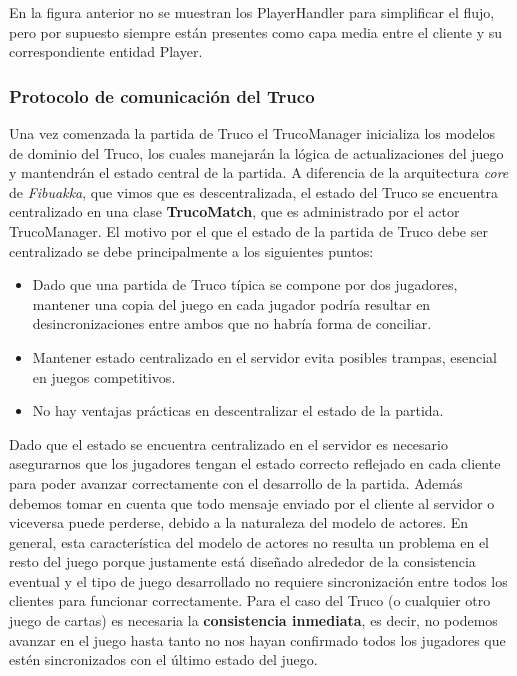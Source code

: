 En la figura anterior no se muestran los PlayerHandler para simplificar el flujo, pero por supuesto siempre están presentes como capa media entre el cliente y su correspondiente entidad Player.

\subsubsection{Protocolo de comunicación del Truco}

\noindent Una vez comenzada la partida de Truco el TrucoManager inicializa los modelos de dominio del Truco, los cuales manejarán la lógica de actualizaciones del juego y mantendrán el estado central
de la partida. A diferencia de la arquitectura \textit{core} de \textit{Fibuakka}, que vimos que es descentralizada, el estado del Truco se encuentra centralizado en una clase \textbf{TrucoMatch}, que es
administrado por el actor TrucoManager. El motivo por el que el estado de la partida de Truco debe ser centralizado se debe principalmente a los siguientes puntos:

\begin{itemize}
    \item Dado que una partida de Truco típica se compone por dos jugadores, mantener una copia del juego en cada jugador podría resultar en desincronizaciones entre ambos que no habría forma de conciliar.
    \item Mantener estado centralizado en el servidor evita posibles trampas, esencial en juegos competitivos.
    \item No hay ventajas prácticas en descentralizar el estado de la partida.
\end{itemize}

Dado que el estado se encuentra centralizado en el servidor es necesario asegurarnos que los jugadores tengan el estado correcto reflejado en cada cliente para poder avanzar correctamente con el desarrollo de la partida.
Además debemos tomar en cuenta que todo mensaje enviado por el cliente al servidor o viceversa puede perderse, debido a la naturaleza del modelo de actores. En general, esta característica del modelo de actores no resulta
un problema en el resto del juego porque justamente está diseñado alrededor de la consistencia eventual y el tipo de juego desarrollado no requiere sincronización entre todos los clientes para funcionar correctamente. Para el caso
del Truco (o cualquier otro juego de cartas) es necesaria la \textbf{consistencia inmediata}, es decir, no podemos avanzar en el juego hasta tanto no nos hayan confirmado todos los jugadores que estén sincronizados con el último estado del juego.

